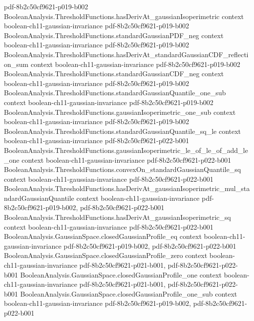 \begin{theorem}
  {pdf-8b2c50cf9621-p019-b002}
\proofstep
  {BooleanAnalysis.ThresholdFunctions.hasDerivAt_gaussianIsoperimetric}
  {context}
  {boolean-ch11-gaussian-invariance}
  {pdf-8b2c50cf9621-p019-b002}
\proofstep
  {BooleanAnalysis.ThresholdFunctions.standardGaussianPDF_neg}
  {context}
  {boolean-ch11-gaussian-invariance}
  {pdf-8b2c50cf9621-p019-b002}
\proofstep
  {BooleanAnalysis.ThresholdFunctions.hasDerivAt_standardGaussianCDF_reflection_sum}
  {context}
  {boolean-ch11-gaussian-invariance}
  {pdf-8b2c50cf9621-p019-b002}
\proofstep
  {BooleanAnalysis.ThresholdFunctions.standardGaussianCDF_neg}
  {context}
  {boolean-ch11-gaussian-invariance}
  {pdf-8b2c50cf9621-p019-b002}
\proofstep
  {BooleanAnalysis.ThresholdFunctions.standardGaussianQuantile_one_sub}
  {context}
  {boolean-ch11-gaussian-invariance}
  {pdf-8b2c50cf9621-p019-b002}
\proofstep
  {BooleanAnalysis.ThresholdFunctions.gaussianIsoperimetric_one_sub}
  {context}
  {boolean-ch11-gaussian-invariance}
  {pdf-8b2c50cf9621-p019-b002}
\proofstep
  {BooleanAnalysis.ThresholdFunctions.standardGaussianQuantile_sq_le}
  {context}
  {boolean-ch11-gaussian-invariance}
  {pdf-8b2c50cf9621-p022-b001}
\proofstep
  {BooleanAnalysis.ThresholdFunctions.gaussianIsoperimetric_le_of_le_of_add_le_one}
  {context}
  {boolean-ch11-gaussian-invariance}
  {pdf-8b2c50cf9621-p022-b001}
\proofstep
  {BooleanAnalysis.ThresholdFunctions.convexOn_standardGaussianQuantile_sq}
  {context}
  {boolean-ch11-gaussian-invariance}
  {pdf-8b2c50cf9621-p022-b001}
\proofstep
  {BooleanAnalysis.ThresholdFunctions.hasDerivAt_gaussianIsoperimetric_mul_standardGaussianQuantile}
  {context}
  {boolean-ch11-gaussian-invariance}
  {pdf-8b2c50cf9621-p019-b002,
    pdf-8b2c50cf9621-p022-b001}
\proofstep
  {BooleanAnalysis.ThresholdFunctions.hasDerivAt_gaussianIsoperimetric_sq}
  {context}
  {boolean-ch11-gaussian-invariance}
  {pdf-8b2c50cf9621-p022-b001}
\proofstep
  {BooleanAnalysis.GaussianSpace.closedGaussianProfile_eq}
  {context}
  {boolean-ch11-gaussian-invariance}
  {pdf-8b2c50cf9621-p019-b002,
    pdf-8b2c50cf9621-p022-b001}
\proofstep
  {BooleanAnalysis.GaussianSpace.closedGaussianProfile_zero}
  {context}
  {boolean-ch11-gaussian-invariance}
  {pdf-8b2c50cf9621-p021-b001,
    pdf-8b2c50cf9621-p022-b001}
\proofstep
  {BooleanAnalysis.GaussianSpace.closedGaussianProfile_one}
  {context}
  {boolean-ch11-gaussian-invariance}
  {pdf-8b2c50cf9621-p021-b001,
    pdf-8b2c50cf9621-p022-b001}
\proofstep
  {BooleanAnalysis.GaussianSpace.closedGaussianProfile_one_sub}
  {context}
  {boolean-ch11-gaussian-invariance}
  {pdf-8b2c50cf9621-p019-b002,
    pdf-8b2c50cf9621-p022-b001}

\end{theorem}
